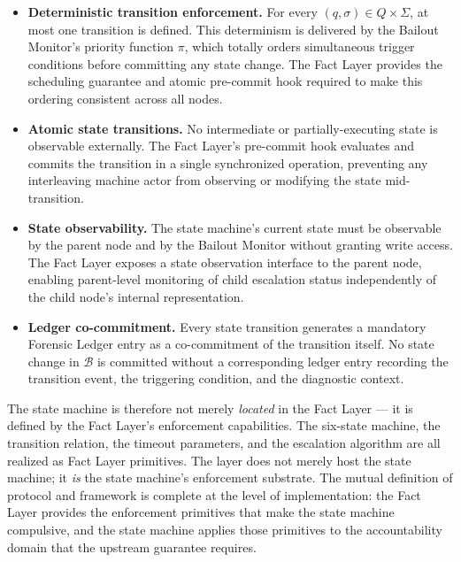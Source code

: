 \begin{itemize}\itemsep=0pt
\item[(\textit{i})] \textbf{Deterministic transition enforcement.} For every $(q, \sigma) \in Q \times \Sigma$, at most one transition is defined. This determinism is delivered by the Bailout Monitor's priority function $\pi$, which totally orders simultaneous trigger conditions before committing any state change. The Fact Layer provides the scheduling guarantee and atomic pre-commit hook required to make this ordering consistent across all nodes.

\item[(\textit{ii})] \textbf{Atomic state transitions.} No intermediate or partially-executing state is observable externally. The Fact Layer's pre-commit hook evaluates and commits the transition in a single synchronized operation, preventing any interleaving machine actor from observing or modifying the state mid-transition.

\item[(\textit{iii})] \textbf{State observability.} The state machine's current state must be observable by the parent node and by the Bailout Monitor without granting write access. The Fact Layer exposes a state observation interface to the parent node, enabling parent-level monitoring of child escalation status independently of the child node's internal representation.

\item[(\textit{iv})] \textbf{Ledger co-commitment.} Every state transition generates a mandatory Forensic Ledger entry as a co-commitment of the transition itself. No state change in $\mathcal{B}$ is committed without a corresponding ledger entry recording the transition event, the triggering condition, and the diagnostic context.
\end{itemize}

The state machine is therefore not merely \emph{located} in the Fact Layer — it is defined by the Fact Layer's enforcement capabilities. The six-state machine, the transition relation, the timeout parameters, and the escalation algorithm are all realized as Fact Layer primitives. The \fact{} layer does not merely host the state machine; it \emph{is} the state machine's enforcement substrate. The mutual definition of protocol and framework is complete at the level of implementation: the Fact Layer provides the enforcement primitives that make the state machine compulsive, and the state machine applies those primitives to the accountability domain that the upstream guarantee requires.

